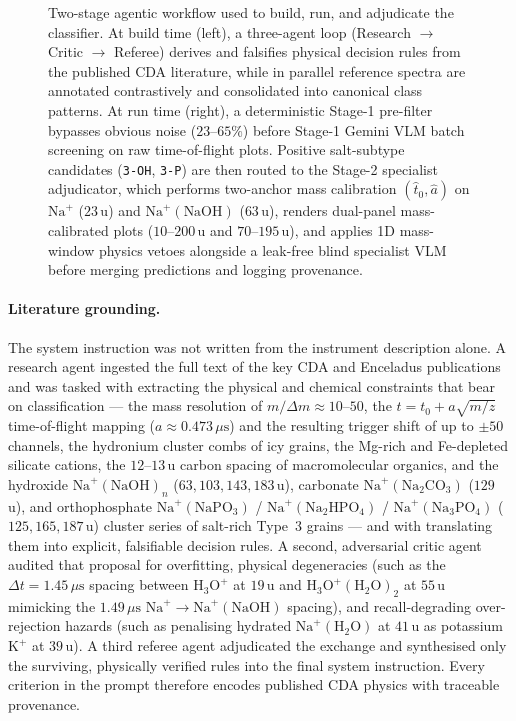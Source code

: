 \documentclass[twocolumn,a4paper,10pt]{article}
\begin{document}
\begin{figure}[t]
{\begin{tikzpicture}
\end{tikzpicture}%
}
\caption{Two-stage agentic workflow used to build, run, and adjudicate the
classifier. At build time (left), a three-agent loop (Research $\rightarrow$
Critic $\rightarrow$ Referee) derives and falsifies physical decision rules from
the published CDA literature, while in parallel reference spectra are annotated
contrastively and consolidated into canonical class patterns. At run time
(right), a deterministic Stage-1 pre-filter bypasses obvious noise ($23\text{--}65\%$)
before Stage-1 Gemini VLM batch screening on raw time-of-flight plots. Positive
salt-subtype candidates (\texttt{3-OH}, \texttt{3-P}) are then routed to the
Stage-2 specialist adjudicator, which performs two-anchor mass calibration
$(\hat{t}_0, \hat{a})$ on $\text{Na}^+$ ($23\,\text{u}$) and
$\text{Na}^+(\text{NaOH})$ ($63\,\text{u}$), renders dual-panel mass-calibrated
plots ($10\text{--}200\,\text{u}$ and $70\text{--}195\,\text{u}$), and applies
1D mass-window physics vetoes alongside a leak-free blind specialist VLM before
merging predictions and logging provenance.}
\label{fig:agentworkflow}
\end{figure}

\paragraph{Literature grounding.}
The system instruction was not written from the instrument description alone.
A research agent ingested the full text of the key CDA and Enceladus
publications and was tasked with extracting the physical and chemical
constraints that bear on classification --- the mass resolution of
$m/\Delta m \approx 10$--$50$, the $t = t_0 + a\sqrt{m/z}$ time-of-flight
mapping ($a \approx 0.473\,\mu\text{s}$) and the resulting trigger shift of up
to $\pm 50$ channels, the hydronium cluster combs of icy grains, the Mg-rich
and Fe-depleted silicate cations, the $12$--$13$\,u carbon spacing of
macromolecular organics, and the hydroxide $\text{Na}^+(\text{NaOH})_n$
($63, 103, 143, 183$\,u), carbonate $\text{Na}^+(\text{Na}_2\text{CO}_3)$
($129$\,u), and orthophosphate $\text{Na}^+(\text{NaPO}_3)$ /
$\text{Na}^+(\text{Na}_2\text{HPO}_4)$ / $\text{Na}^+(\text{Na}_3\text{PO}_4)$
($125, 165, 187$\,u) cluster series of salt-rich Type~3 grains --- and with
translating them into explicit, falsifiable decision rules. A second,
adversarial critic agent audited that proposal for overfitting, physical
degeneracies (such as the $\Delta t = 1.45\,\mu\text{s}$ spacing between
$\text{H}_3\text{O}^+$ at $19$\,u and $\text{H}_3\text{O}^+(\text{H}_2\text{O})_2$
at $55$\,u mimicking the $1.49\,\mu\text{s}$ $\text{Na}^+ \rightarrow
\text{Na}^+(\text{NaOH})$ spacing), and recall-degrading over-rejection
hazards (such as penalising hydrated $\text{Na}^+(\text{H}_2\text{O})$ at
$41$\,u as potassium $\text{K}^+$ at $39$\,u). A third referee agent
adjudicated the exchange and synthesised only the surviving, physically verified
rules into the final system instruction. Every criterion in the prompt
therefore encodes published CDA physics with traceable provenance.
\end{document}
